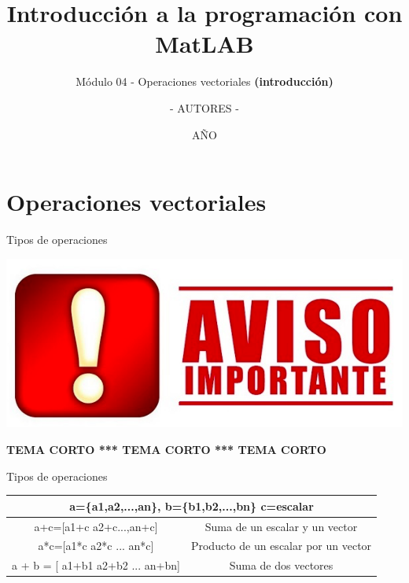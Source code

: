 \documentclass{bredelebeamer}
\title[Programación en MatLAB]{Introducción a la programación con MatLAB}
\subtitle{Módulo 04 - Operaciones vectoriales \textbf{(introducción)}}
\author{- AUTORES - \inst{1}}
\institute[UNIVERSIDAD]
{
  \inst{1}%
  - NOMBRE UNIVERSIDAD - 
  }
\date{AÑO}
\begin{document}
\begin{frame}
  \titlepage 
\end{frame}




\section{Operaciones vectoriales}

\begin{frame}{Tipos de operaciones}
\begin{center}
\includegraphics[scale=0.3]{images/img40.png}
\end{center}
\begin{center}
\textbf{TEMA CORTO *** TEMA CORTO *** TEMA CORTO}
\end{center}
\end{frame}

\begin{frame}{Tipos de operaciones}
\begin{table}[]
\centering
\begin{tabular}{|c|c|}
\hline
\multicolumn{2}{|c|}{a=\{a1,a2,...,an\}, b=\{b1,b2,...,bn\} c=escalar}                                                                           \\ \hline
a+c={[}a1+c a2+c...,an+c{]}                                                                            & Suma de un escalar y un vector          \\ \hline
a*c={[}a1*c a2*c ... an*c{]}                                                                           & Producto de un escalar por un vector    \\ \hline
a + b = {[} a1+b1 a2+b2 ... an+bn{]}                                                                   & Suma de dos vectores                    \\ \hline
\end{tabular}
\end{table}
\end{frame}
\end{document}
